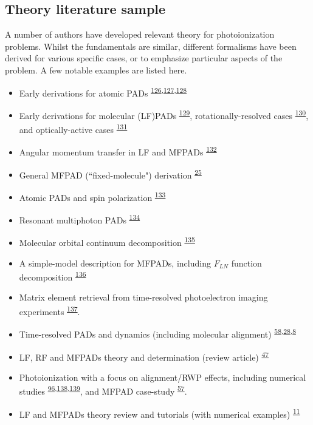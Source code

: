 \documentclass[10pt]{article}
\begin{document}

\subsection{Theory literature sample\label{sec:theory-lit}}

A number of authors have developed relevant theory for photoionization problems. Whilst the fundamentals are similar, different formalisms have been derived for various specific cases, or to emphasize particular aspects of the problem. A few notable examples are listed here.

\begin{itemize}
\item Early derivations for atomic PADs \textsuperscript{\hyperref[csl:126]{126},\hyperref[csl:127]{127},\hyperref[csl:128]{128}}
\item Early derivations for molecular (LF)PADs \textsuperscript{\hyperref[csl:129]{129}}, rotationally-resolved cases \textsuperscript{\hyperref[csl:130]{130}}, and optically-active cases \textsuperscript{\hyperref[csl:131]{131}}
\item Angular momentum transfer in LF and MFPADs \textsuperscript{\hyperref[csl:132]{132}} 
\item General MFPAD (``fixed-molecule") derivation \textsuperscript{\hyperref[csl:25]{25}}
\item Atomic PADs and spin polarization \textsuperscript{\hyperref[csl:133]{133}}
\item Resonant multiphoton PADs \textsuperscript{\hyperref[csl:134]{134}}
\item Molecular orbital continuum decomposition \textsuperscript{\hyperref[csl:135]{135}}
\item A simple-model description for MFPADs, including $F_{LN}$ function decomposition \textsuperscript{\hyperref[csl:136]{136}}
\item Matrix element retrieval from time-resolved photoelectron imaging experiments \textsuperscript{\hyperref[csl:137]{137}}.
\item Time-resolved PADs and dynamics (including molecular alignment) \textsuperscript{\hyperref[csl:58]{58},\hyperref[csl:28]{28},\hyperref[csl:8]{8}}
\item LF, RF and MFPADs theory and determination (review article) \textsuperscript{\hyperref[csl:47]{47}}
\item Photoionization with a focus on alignment/RWP effects, including numerical studies \textsuperscript{\hyperref[csl:96]{96},\hyperref[csl:138]{138},\hyperref[csl:139]{139}}, and MFPAD case-study \textsuperscript{\hyperref[csl:57]{57}}.
\item LF and MFPADs theory review and tutorials (with numerical examples) \textsuperscript{\hyperref[csl:11]{11}}
\end{itemize}
\end{document}
